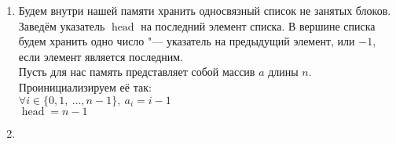 \documentclass[a4paper, 11pt]{article}
\begin{document}
\begin{enumerate}
\item
\begin{enumerate}
	Будем внутри нашей памяти хранить односвязный список не занятых блоков. Заведём указатель $\operatorname{head}$ на последний элемент списка. В вершине списка будем хранить одно число "--- указатель на предыдущий элемент, или $-1$, если элемент является последним.\\Пусть для нас память представляет собой массив $a$ длины $n$. Проинициализируем её так:\\$\forall i \in \{0, 1, \medspace \ldots, n - 1\}, \medspace a_i = i - 1$\\
	$\operatorname{head} = n - 1$
\end{enumerate}

\item
\begin{enumerate}
\end{enumerate}

\end{enumerate}
\end{document}
